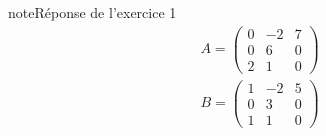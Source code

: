 \documentclass[letterpaper,10pt,french]{jupyterBook}
\begin{document}
\begin{sphinxadmonition}{note}{Réponse de l’exercice 1}
\begin{equation*}
\begin{split}
A = 
\begin{pmatrix}
0 & -2 & 7 \\
0 & 6 & 0  \\
2 & 1 & 0 
\end{pmatrix}
\end{split}
\end{equation*}\begin{equation*}
\begin{split}
B = 
\begin{pmatrix}
1 & -2 & 5 \\
0 & 3 & 0  \\
1 & 1 & 0 
\end{pmatrix}
\end{split}
\end{equation*}\end{sphinxadmonition}
\end{document}
